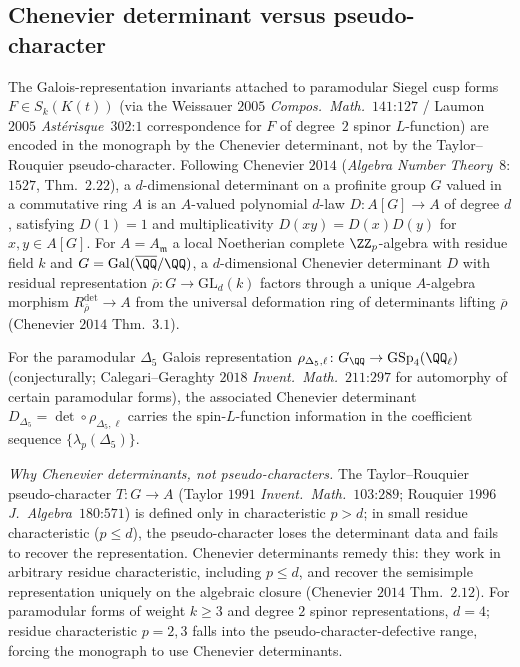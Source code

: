 \subsection{Chenevier determinant versus pseudo-character}
\label{wn:subsec:third-pass-Chenevier}

\begin{theorem}
\label{wn:thm:third-pass-Chenevier}

The Galois-representation invariants attached to paramodular Siegel
cusp forms $F \in S_k(K(t))$ (via the Weissauer $2005$
\emph{Compos.~Math.}~$141$:$127$ / Laumon $2005$
\emph{Ast\'erisque}~$302$:$1$ correspondence for $F$ of degree~$2$
spinor $L$-function) are encoded in the monograph by the Chenevier
determinant, not by the Taylor--Rouquier pseudo-character. Following
Chenevier $2014$ (\emph{Algebra Number Theory}~$8$:$1527$,
Thm.~$2.22$), a $d$-dimensional determinant on a profinite group
$G$ valued in a commutative ring $A$ is an $A$-valued polynomial
$d$-law $D\colon A[G] \to A$ of degree $d$, satisfying $D(1) = 1$
and multiplicativity $D(xy) = D(x)D(y)$ for $x, y \in A[G]$. For
$A = A_{\mathfrak{m}}$ a local Noetherian complete $\ZZ_p$-algebra
with residue field $k$ and $G = \mathrm{Gal}(\overline{\QQ}/\QQ)$,
a $d$-dimensional Chenevier determinant $D$ with residual
representation
$\overline{\rho}\colon G \to \mathrm{GL}_d(k)$ factors through a
unique $A$-algebra morphism
$R_{\overline{\rho}}^{\mathrm{det}} \to A$ from the universal
deformation ring of determinants lifting $\overline{\rho}$ (Chenevier
$2014$ Thm.~$3.1$).

For the paramodular $\Delta_5$ Galois representation
$\rho_{\Delta_5, \ell}\colon G_\QQ \to \mathrm{GSp}_4(\QQ_\ell)$
(conjecturally; Calegari--Geraghty $2018$
\emph{Invent.~Math.}~$211$:$297$ for automorphy of certain
paramodular forms), the associated Chenevier determinant
$D_{\Delta_5} = \det \circ \rho_{\Delta_5, \ell}$ carries the
spin-$L$-function information in the coefficient sequence
$\{\lambda_p(\Delta_5)\}$.

\emph{Why Chenevier determinants, not pseudo-characters.} The
Taylor--Rouquier pseudo-character
$T\colon G \to A$ (Taylor $1991$ \emph{Invent.~Math.}~$103$:$289$;
Rouquier $1996$ \emph{J.~Algebra}~$180$:$571$) is defined only in
characteristic $p > d$; in small residue characteristic ($p \leq d$),
the pseudo-character loses the determinant data and fails to recover
the representation. Chenevier determinants remedy this: they work in
arbitrary residue characteristic, including $p \leq d$, and recover
the semisimple representation uniquely on the algebraic closure
(Chenevier $2014$ Thm.~$2.12$). For paramodular forms of weight
$k \geq 3$ and degree $2$ spinor representations, $d = 4$; residue
characteristic $p = 2, 3$ falls into the pseudo-character-defective
range, forcing the monograph to use Chenevier determinants.


\end{theorem}
